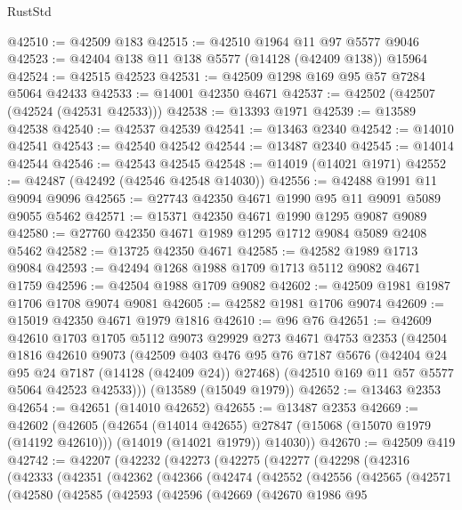 \begin{lexlean}{RustStd}
\begin{coremodule}
@42510 := @42509 @183
@42515 := @42510 @1964 @11 @97 @5577 @9046
@42523 := @42404 @138 @11 @138 @5577 (@14128 (@42409 @138)) @15964
@42524 := @42515 @42523
@42531 := @42509 @1298 @169 @95 @57 @7284 @5064 @42433
@42533 := @14001 @42350 @4671
@42537 := @42502 (@42507 (@42524 (@42531 @42533)))
@42538 := @13393 @1971
@42539 := @13589 @42538
@42540 := @42537 @42539
@42541 := @13463 @2340
@42542 := @14010 @42541
@42543 := @42540 @42542
@42544 := @13487 @2340
@42545 := @14014 @42544
@42546 := @42543 @42545
@42548 := @14019 (@14021 @1971)
@42552 := @42487 (@42492 (@42546 @42548 @14030))
@42556 := @42488 @1991 @11 @9094 @9096
@42565 := @27743 @42350 @4671 @1990 @95 @11 @9091 @5089 @9055 @5462
@42571 := @15371 @42350 @4671 @1990 @1295 @9087 @9089
@42580 := @27760 @42350 @4671 @1989 @1295 @1712 @9084 @5089 @2408 @5462
@42582 := @13725 @42350 @4671
@42585 := @42582 @1989 @1713 @9084
@42593 := @42494 @1268 @1988 @1709 @1713 @5112 @9082 @4671 @1759
@42596 := @42504 @1988 @1709 @9082
@42602 := @42509 @1981 @1987 @1706 @1708 @9074 @9081
@42605 := @42582 @1981 @1706 @9074
@42609 := @15019 @42350 @4671 @1979 @1816
@42610 := @96 @76
@42651 := @42609
    @42610
    @1703
    @1705
    @5112
    @9073
    @29929
    @273
    @4671
    @4753
    @2353
    (@42504
      @1816
      @42610
      @9073
      (@42509
        @403
        @476
        @95
        @76
        @7187
        @5676
        (@42404 @24 @95 @24 @7187 (@14128 (@42409 @24)) @27468)
        (@42510 @169 @11 @57 @5577 @5064 @42523 @42533)))
    (@13589 (@15049 @1979))
@42652 := @13463 @2353
@42654 := @42651 (@14010 @42652)
@42655 := @13487 @2353
@42669 := @42602
    (@42605
      (@42654
        (@14014 @42655)
        @27847
        (@15068 (@15070 @1979 (@14192 @42610)))
        (@14019 (@14021 @1979))
        @14030))
@42670 := @42509 @419
@42742 := @42207
    (@42232
      (@42273
        (@42275
          (@42277
            (@42298
              (@42316
                (@42333
                  (@42351
                    (@42362
                      (@42366
                        (@42474
                          (@42552
                            (@42556
                              (@42565
                                (@42571
                                  (@42580
                                    (@42585
                                      (@42593
                                        (@42596
                                          (@42669
                                            (@42670
                                              @1986
                                              @95

\end{coremodule}
\end{lexlean}
